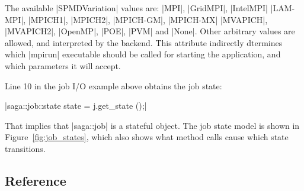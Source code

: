   \DefineShortVerb{\|}

  The available |SPMDVariation| values are: |MPI|, |GridMPI|,
  |IntelMPI| |LAM-MPI|, |MPICH1|, |MPICH2|, |MPICH-GM|, |MPICH-MX|
  |MVAPICH|, |MVAPICH2|, |OpenMP|, |POE|, |PVM| and |None|.  Other
  arbitrary values are allowed, and interpreted by the backend.  This
  attribute indirectly dtermines which |mpirun| executable should be
  called for starting the application, and which parameters it will
  accept.
  

  Line 10 in the job I/O example above obtains the job state:

  \shift |saga::job::state state = j.get_state ();|

  That implies that |saga::job| is a stateful object.  The job state
  model is shown in Figure~\ref{fig:job_states}, which also shows what
  method calls cause which state transitions.



 \subsection{Reference}

